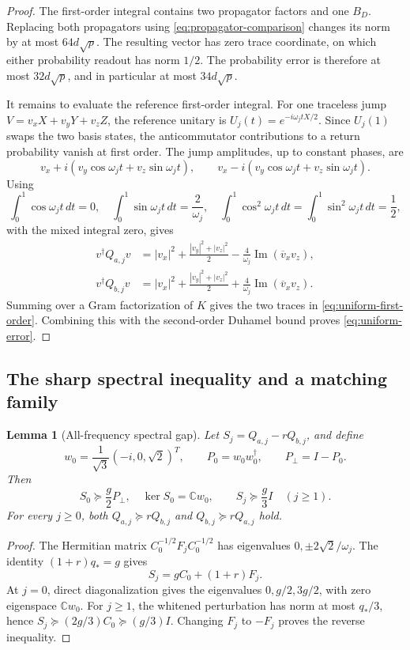 \documentclass[11pt]{article}
\newtheorem{lemma}[theorem]{Lemma}
\theoremstyle{definition}
\theoremstyle{remark}
\DeclareMathOperator{\Ima}{Im}
\newcommand{\C}{\mathbb C}
\begin{document}
\begin{proof}
The first-order integral contains two propagator factors and one \(B_D\). Replacing both propagators using \eqref{eq:propagator-comparison} changes its norm by at most \(64d\sqrt p\). The resulting vector has zero trace coordinate, on which either probability readout has norm \(1/2\). The probability error is therefore at most \(32d\sqrt p\), and in particular at most \(34d\sqrt p\).

It remains to evaluate the reference first-order integral. For one traceless jump \(V=v_xX+v_yY+v_zZ\), the reference unitary is \(U_j(t)=e^{-i\omega_jtX/2}\). Since \(U_j(1)\) swaps the two basis states, the anticommutator contributions to a return probability vanish at first order. The jump amplitudes, up to constant phases, are
\[
 v_x+i(v_y\cos\omega_jt+v_z\sin\omega_jt),\qquad
 v_x-i(v_y\cos\omega_jt+v_z\sin\omega_jt).
\]
Using
\[
 \int_0^1\cos\omega_jt\,dt=0,\quad
 \int_0^1\sin\omega_jt\,dt=\frac2{\omega_j},\quad
 \int_0^1\cos^2\omega_jt\,dt=\int_0^1\sin^2\omega_jt\,dt=\frac12,
\]
with the mixed integral zero, gives
\begin{equation}\label{eq:quadratic-forms}
 \begin{aligned}
 v^\dagger Q_{a,j}v&=|v_x|^2+\frac{|v_y|^2+|v_z|^2}{2}
 -\frac4{\omega_j}\Ima(\overline v_xv_z),\\
 v^\dagger Q_{b,j}v&=|v_x|^2+\frac{|v_y|^2+|v_z|^2}{2}
 +\frac4{\omega_j}\Ima(\overline v_xv_z).
 \end{aligned}
\end{equation}
Summing over a Gram factorization of \(K\) gives the two traces in \eqref{eq:uniform-first-order}. Combining this with the second-order Duhamel bound proves \eqref{eq:uniform-error}.
\end{proof}

\subsection{The sharp spectral inequality and a matching family}
\begin{lemma}[All-frequency spectral gap]\label{lem:spectrum}
Let \(S_j=Q_{a,j}-rQ_{b,j}\), and define
\begin{equation}\label{eq:kernel}
 w_0=\frac1{\sqrt3}(-i,0,\sqrt2)^T,\qquad
 P_0=w_0w_0^\dagger,\qquad P_\perp=I-P_0.
\end{equation}
Then
\begin{equation}\label{eq:spectral-gap}
 S_0\succeq\frac g2P_\perp,\quad \ker S_0=\C w_0,
 \qquad S_j\succeq\frac g3I\quad(j\geq1).
\end{equation}
For every \(j\geq0\), both \(Q_{a,j}\succeq rQ_{b,j}\) and \(Q_{b,j}\succeq rQ_{a,j}\) hold.
\end{lemma}
\begin{proof}
The Hermitian matrix \(C_0^{-1/2}F_jC_0^{-1/2}\) has eigenvalues
\(0,\pm2\sqrt2/\omega_j\). The identity \((1+r)q_*=g\) gives
\[
 S_j=gC_0+(1+r)F_j.
\]
At \(j=0\), direct diagonalization gives the eigenvalues \(0,g/2,3g/2\), with zero eigenspace \(\C w_0\). For \(j\geq1\), the whitened perturbation has norm at most \(q_*/3\), hence \(S_j\succeq(2g/3)C_0\succeq(g/3)I\). Changing \(F_j\) to \(-F_j\) proves the reverse inequality.
\end{proof}
\end{document}
